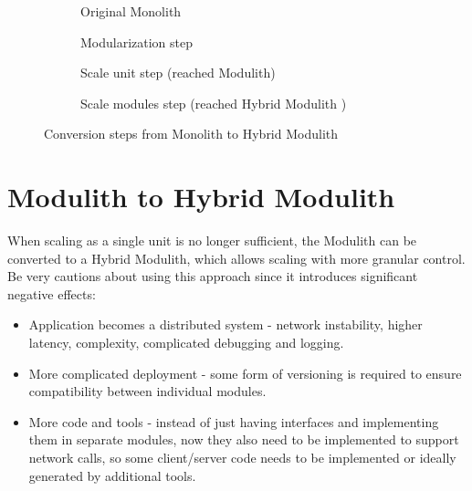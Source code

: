 \begin{figure}
    \centering
    \begin{subfigure}{.5\textwidth}
        \centering
        
        \caption{Original Monolith}
    \end{subfigure}%
    \begin{subfigure}{.5\textwidth}
        \centering
        
        \caption{Modularization step}
    \end{subfigure}
    \begin{subfigure}{\textwidth}
        \centering
        
        \caption{Scale unit step (reached Modulith)\label{fig:scale_as_unit}}
    \end{subfigure}%
    \hfill
    \begin{subfigure}{\textwidth}
        \centering
        
        \caption{Scale modules step (reached Hybrid Modulith \label{fig:hybrid_modulith})}
    \end{subfigure}
    \caption{Conversion steps from Monolith to Hybrid Modulith}
    \label{fig:monolith_to_modulith_steps}
\end{figure}

\section{Modulith to Hybrid Modulith}
\label{subsection:modulith_to_hybrid_modulith}
When scaling as a single unit is no longer sufficient, the Modulith can be converted to a Hybrid Modulith, which allows scaling with more granular control. Be very cautions about using this approach since it introduces significant negative effects:
\begin{itemize}
    \item Application becomes a distributed system - network instability, higher latency, complexity, complicated debugging and logging.
    \item More complicated deployment - some form of versioning is required to ensure compatibility between individual modules.
    \item More code and tools - instead of just having interfaces and implementing them in separate modules, now they also need to be implemented to support network calls, so some client/server code needs to be implemented or ideally generated by additional tools.
\end{itemize}

